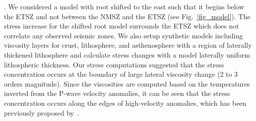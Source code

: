 \documentclass[draft,linenumbers]{agujournal2018}
\begin{document}
     . We considered a model with root shifted to the east such that it begins below the ETSZ and not between the NMSZ and the ETSZ (see Fig.~\ref{fig_model}). The stress increase for the shifted root model surrounds the ETSZ which does not correlate any observed seismic zones. We also setup synthetic models including viscosity layers for crust, lithosphere, and asthenosphere with a region of laterally thickened lithosphere and calculate stress changes with a model laterally uniform lithospheric thickness. Our stress computations suggested that the stress concentration occurs at the boundary of large lateral viscosity change (2 to 3 orders magnitude). Since the viscosities are computed based on the temperatures inverted from the P-wave velocity anomalies, it can be seen that the stress concentration occurs along the edges of high-velocity anomalies, which has been previously proposed by~\citet{zhang2009tomographic}. 
    
    
\end{document}
